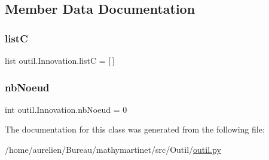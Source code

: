 \subsection{Member Data Documentation}
\mbox{\label{classoutil_1_1_innovation_adbf19c50b8c62928eaf5c364cad9afba}} 
\subsubsection{\texorpdfstring{listC}{listC}}
{\footnotesize\ttfamily list outil.\+Innovation.\+listC = \mbox{[}$\,$\mbox{]}\hspace{0.3cm}{\ttfamily [static]}}

\mbox{\label{classoutil_1_1_innovation_a51c71af8c3246b01cff5c2140ca8b7ba}} 
\subsubsection{\texorpdfstring{nb\+Noeud}{nbNoeud}}
{\footnotesize\ttfamily int outil.\+Innovation.\+nb\+Noeud = 0\hspace{0.3cm}{\ttfamily [static]}}



The documentation for this class was generated from the following file\+:\begin{DoxyCompactItemize}
\item 
/home/aurelien/\+Bureau/mathymartinet/src/\+Outil/\hyperlink{outil_8py}{outil.\+py}\end{DoxyCompactItemize}
